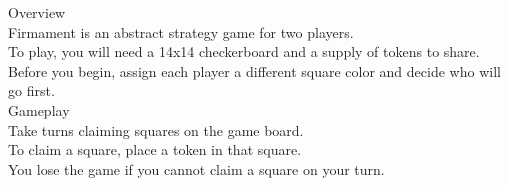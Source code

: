 \begin{minipage}{6cm}\raggedright
{\setmainfont[Scale=0.95]{Century Gothic-Bold}\LARGE Overview}\\[1.0ex]

\setmainfont{Tex Gyre Schola}
Firmament is an abstract strategy game for two players.\\[1.25ex]

To play, you will need a 14x14 checkerboard and a supply of tokens to share.\\[1.25ex]

Before you begin, assign each player a different square color and decide who will go first.\\[3.375ex]

{\setmainfont[Scale=0.95]{Century Gothic-Bold}\LARGE Gameplay}\\[1.0ex]

Take turns claiming squares on the game board.\\[1.25ex]

To claim a square, place a token in that square. \\[1.25ex]

You lose the game if you cannot claim a square on your turn.\\[3ex]


\end{minipage}